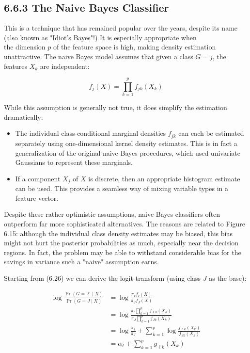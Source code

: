 \documentclass[10pt]{article}
\begin{document}
\subsection*{6.6.3 The Naive Bayes Classifier}
This is a technique that has remained popular over the years, despite its name (also known as "Idiot's Bayes"!) It is especially appropriate when\\
the dimension $p$ of the feature space is high, making density estimation unattractive. The naive Bayes model assumes that given a class $G=j$, the features $X_{k}$ are independent:


\begin{equation*}
f_{j}(X)=\prod_{k=1}^{p} f_{j k}\left(X_{k}\right) \tag{6.26}
\end{equation*}


While this assumption is generally not true, it does simplify the estimation dramatically:

\begin{itemize}
  \item The individual class-conditional marginal densities $f_{j k}$ can each be estimated separately using one-dimensional kernel density estimates. This is in fact a generalization of the original naive Bayes procedures, which used univariate Gaussians to represent these marginals.
  \item If a component $X_{j}$ of $X$ is discrete, then an appropriate histogram estimate can be used. This provides a seamless way of mixing variable types in a feature vector.
\end{itemize}

Despite these rather optimistic assumptions, naive Bayes classifiers often outperform far more sophisticated alternatives. The reasons are related to Figure 6.15: although the individual class density estimates may be biased, this bias might not hurt the posterior probabilities as much, especially near the decision regions. In fact, the problem may be able to withstand considerable bias for the savings in variance such a "naive" assumption earns.

Starting from (6.26) we can derive the logit-transform (using class $J$ as the base):


\begin{align*}
\log \frac{\operatorname{Pr}(G=\ell \mid X)}{\operatorname{Pr}(G=J \mid X)} & =\log \frac{\pi_{\ell} f_{\ell}(X)}{\pi_{J} f_{J}(X)} \\
& =\log \frac{\pi_{\ell} \prod_{k=1}^{p} f_{\ell k}\left(X_{k}\right)}{\pi_{J} \prod_{k=1}^{p} f_{J k}\left(X_{k}\right)} \\
& =\log \frac{\pi_{\ell}}{\pi_{J}}+\sum_{k=1}^{p} \log \frac{f_{\ell k}\left(X_{k}\right)}{f_{J k}\left(X_{k}\right)}  \tag{6.27}\\
& =\alpha_{\ell}+\sum_{k=1}^{p} g_{\ell k}\left(X_{k}\right)
\end{align*}
\end{document}
